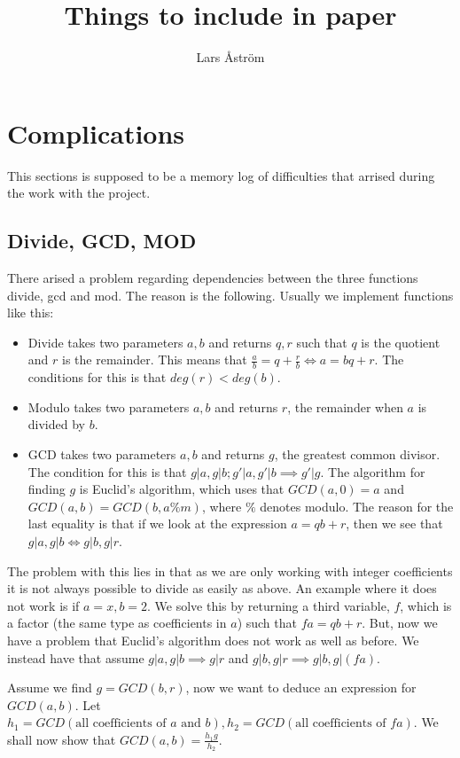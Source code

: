 \documentclass[a4paper, 12pt]{article}
\title{Things to include in paper}
\author{Lars Åström}
\let\stdsection\section
\renewcommand\section{\newpage\stdsection}
\theoremstyle{definition}
\begin{document}
\maketitle
\section{Complications}
This sections is supposed to be a memory log of difficulties that arrised during the work with the project.
\subsection{Divide, GCD, MOD}
There arised a problem regarding dependencies between the three functions divide, gcd and mod. The reason is the following. Usually we implement functions like this:
\begin{itemize}
  \item Divide takes two parameters $a, b$ and returns $q, r$ such that $q$ is the quotient and $r$ is the remainder. This means that $\frac{a}{b}=q+\frac{r}{b} \iff a=bq+r$. The conditions for this is that $deg(r)<deg(b)$.
  \item Modulo takes two parameters $a, b$ and returns $r$, the remainder when $a$ is divided by $b$.
  \item GCD takes two parameters $a, b$ and returns $g$, the greatest common divisor. The condition for this is that $g|a, g|b; g'|a, g'|b \implies g'|g$. The algorithm for finding $g$ is Euclid's algorithm, which uses that $GCD(a,0)=a$ and $GCD(a,b)=GCD(b,a\%m)$, where $\%$ denotes modulo. The reason for the last equality is that if we look at the expression $a=qb+r$, then we see that $g|a, g|b \iff g|b, g|r$.
\end{itemize}
The problem with this lies in that as we are only working with integer coefficients it is not always possible to divide as easily as above. An example where it does not work is if $a=x, b=2$. We solve this by returning a third variable, $f$, which is a factor (the same type as coefficients in $a$) such that $fa=qb+r$. But, now we have a problem that Euclid's algorithm does not work as well as before. We instead have that assume $g|a,g|b \implies g|r$ and $g|b,g|r \implies g|b,g|(fa)$.

Assume we find $g=GCD(b,r)$, now we want to deduce an expression for $GCD(a,b)$. Let $h_1=GCD(\text{all coefficients of } a \text{ and } b), h_2=GCD(\text{all coefficients of } fa)$. We shall now show that $GCD(a,b)=\frac{h_1g}{h_2}$. 
\end{document}
